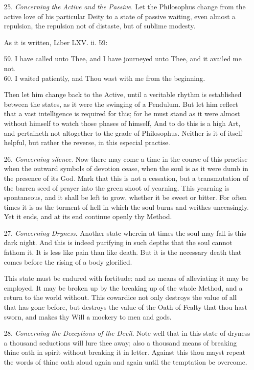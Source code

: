 25. \textit{Concerning the Active and the Passive.} Let the Philosophus change from the active love of his particular Deity to a state of passive waiting, even almost a repulsion, the repulsion not of distaste, but of sublime modesty.

As it is written, Liber LXV. ii. 59:
\begin{quoting}[indentfirst=false]
59. I have called unto Thee, and I have journeyed unto Thee, and it availed me not. \\
60. I waited patiently, and Thou wast with me from the beginning.
\end{quoting}

Then let him change back to the Active, until a veritable rhythm is established between the states, as it were the swinging of a Pendulum. But let him reflect that a vast intelligence is required for this; for he must stand as it were almost without himself to watch those phases of himself, And to do this is a high Art, and pertaineth not altogether to the grade of Philosophus. Neither is it of itself helpful, but rather the reverse, in this especial practise.

26. \textit{Concerning silence.} Now there may come a time in the course of this practise when the outward symbols of devotion cease, when the soul is as it were dumb in the presence of its God. Mark that this is not a cessation, but a transmutation of the barren seed of prayer into the green shoot of yearning. This yearning is spontaneous, and it shall be left to grow, whether it be sweet or bitter. For often times it is as the torment of hell in which the soul burns and writhes unceasingly. Yet it ends, and at its end continue openly thy Method.

27. \textit{Concerning Dryness.} Another state wherein at times the soul may fall is this dark night. And this is indeed purifying in such depths that the soul cannot fathom it. It is less like pain than like death. But it is the necessary death that comes before the rising of a body glorified.

This state must be endured with fortitude; and no means of alleviating it may be employed. It may be broken up by the breaking up of the whole Method, and a return to the world without. This cowardice not only destroys the value of all that has gone before, but destroys the value of the Oath of Fealty that thou hast sworn, and makes thy Will a mockery to men and gods.

28. \textit{Concerning the Deceptions of the Devil.} Note well that in this state of dryness a thousand seductions will lure thee away; also a thousand means of breaking thine oath in spirit without breaking it in letter. Against this thou mayst repeat the words of thine oath aloud again and again until the temptation be overcome.


